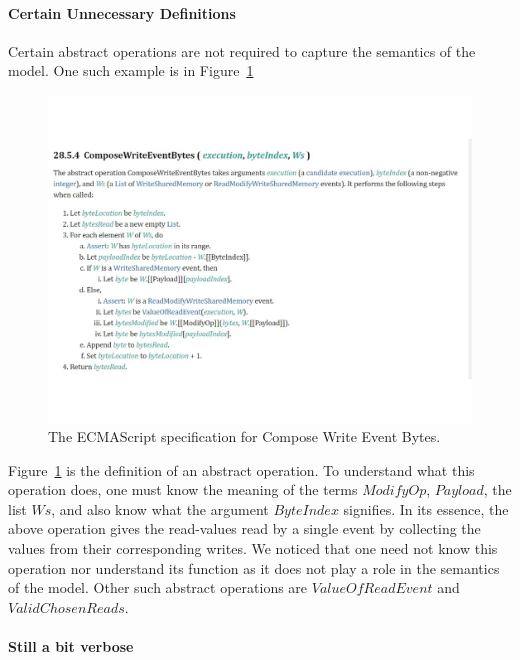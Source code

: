 \paragraph{Certain Unnecessary Definitions}
    Certain abstract operations are not required to capture the semantics of the model. 
    One such example is in Figure~\ref{model:Std2}
    \begin{figure}[H]
        \centering 
        \includegraphics[scale=0.6]{4.ECMAScriptMemoryModel/ECMAScriptStd.pdf}
        \caption{The ECMAScript specification for Compose Write Event Bytes.}
        \label{model:Std2}
    \end{figure}
    Figure~\ref{model:Std2} is the definition of an abstract operation. To understand what this operation does, one must know the meaning of the terms $ModifyOp$, $Payload$, the list $Ws$, and also know what the argument $ByteIndex$ signifies. 
    In its essence, the above operation gives the read-values read by a single event by collecting the values from their corresponding writes. 
    We noticed that one need not know this operation nor understand its function as it does not play a role in the semantics of the model. 
    Other such abstract operations are $ValueOfReadEvent$ and $ValidChosenReads$. 

\paragraph{Still a bit verbose}
    
